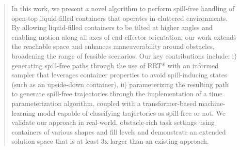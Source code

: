 \begin{abstract}
In this work, we present a novel algorithm to perform spill-free handling of open-top liquid-filled containers that operates in cluttered environments.
By allowing liquid-filled containers to be tilted at higher angles and enabling motion along all axes of end-effector orientation, our work extends the reachable space and enhances maneuverability around obstacles, broadening the range of feasible scenarios.
Our key contributions include: i) generating spill-free paths through the use of RRT* with an informed sampler that leverages container properties to avoid spill-inducing states (such as an upside-down container), ii) parameterizing the resulting path to generate spill-free trajectories through the implementation of a time parameterization algorithm, coupled with a transformer-based machine-learning model capable of classifying trajectories as spill-free or not.
We validate our approach in real-world, obstacle-rich task settings using containers of various shapes and fill levels and demonstrate an extended solution space that is at least 3x larger than an existing approach.




 




\end{abstract}
